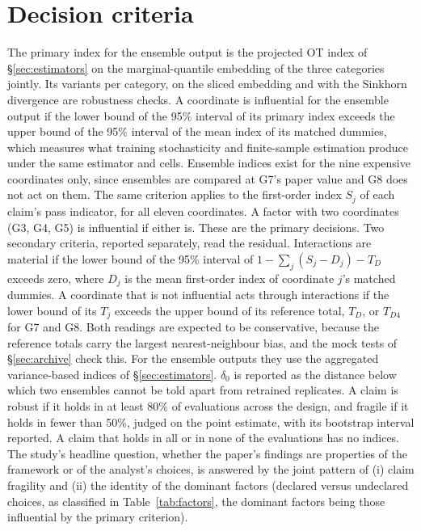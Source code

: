 \documentclass[11pt,a4paper]{article}
\begin{document}
\section{Decision criteria}\label{sec:criteria}
The primary index for the ensemble output is the projected OT index
of \S\ref{sec:estimators} on the marginal-quantile embedding of the three
categories jointly. Its variants per category, on the sliced embedding and
with the Sinkhorn divergence are robustness checks. A coordinate is
influential for the ensemble output if the lower bound of the 95\%
interval of its primary index exceeds the upper bound of the 95\% interval
of the mean index of its matched dummies, which measures what training
stochasticity and finite-sample estimation produce under the same
estimator and cells. Ensemble indices exist for the nine expensive
coordinates only, since ensembles are compared at G7's paper value and G8
does not act on them. The same criterion applies to the first-order index
$S_j$ of each claim's pass indicator, for all eleven coordinates. A factor
with two coordinates (G3, G4, G5) is influential if either is. These are
the primary decisions. Two secondary criteria, reported separately, read
the residual. Interactions are material if the lower bound of the 95\%
interval of $1-\sum_j (S_j-D_j)-T_D$ exceeds zero, where $D_j$ is the mean
first-order index of coordinate $j$'s matched dummies. A coordinate that
is not influential acts through interactions if the lower bound of its
$T_j$ exceeds the upper bound of its reference total, $T_D$, or $T_{D4}$
for G7 and G8. Both readings are expected to be conservative, because the
reference totals carry the largest nearest-neighbour bias, and the mock
tests of \S\ref{sec:archive} check this. For the ensemble outputs they use
the aggregated variance-based indices of \S\ref{sec:estimators}.
$\delta_0$ is reported as the distance below which two ensembles cannot
be told apart from retrained replicates. A claim is robust if it holds
in at least 80\% of evaluations across the design, and fragile if
it holds in fewer than 50\%, judged on the point estimate, with its
bootstrap interval reported. A claim that holds in all or in none of the
evaluations has no indices. The study's headline question, whether the
paper's findings are properties of the framework or of the analyst's
choices, is answered by the joint pattern of (i) claim fragility and (ii)
the identity of the dominant factors (declared versus undeclared
choices, as classified in Table~\ref{tab:factors}, the dominant
factors being those influential by the primary criterion).
\end{document}
